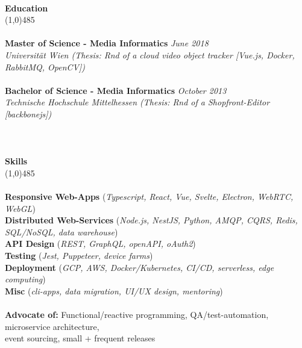 \documentclass[9pt]{extarticle}
\newcommand\tab[1][1cm]{\hspace*{#1}}
\newcommand\smallspace[1][0.23cm]{\hspace*{#1}}
\newcommand\negativespace[1][-0.12cm]{\hspace*{#1}}
\begin{document}
\noindent %
\\
\vspace*{-6pt}
{\negativespace \Large \bf Education}\\
\line(1,0){485}\\
\\
\noindent
{\bf Master of Science - Media Informatics} \hfill \textit{June 2018} \\ 
\textit{Universität Wien (Thesis: Rnd of a cloud video object tracker [Vue.js, Docker, RabbitMQ, OpenCV])}\\\\
\noindent
{\bf Bachelor of Science - Media Informatics} \hfill \textit{October 2013} \\
\textit{Technische Hochschule Mittelhessen (Thesis: Rnd of a Shopfront-Editor [backbonejs])}\\
\\
\\\\
\vspace*{-6pt}
{\negativespace \Large \bf Skills}\\
\line(1,0){485}\\
\\
\noindent
{\bf Responsive Web-Apps } (\textit{Typescript, React, Vue, Svelte, Electron, WebRTC, WebGL}) \\
{\bf Distributed Web-Services } (\textit{Node.js, NestJS, Python, AMQP, CQRS, Redis, SQL/NoSQL, data warehouse}) \\
{\bf API Design }(\textit{REST, GraphQL, openAPI, oAuth2}) \\
{\bf Testing }(\textit{Jest, Puppeteer, device farms}) \\
{\bf Deployment }(\textit{GCP, AWS, Docker/Kubernetes, CI/CD, serverless, edge computing}) \\
{\bf Misc }(\textit{cli-apps, data migration, UI/UX design, mentoring}) \\\\
\noindent
{\bf Advocate of:} Functional/reactive programming, QA/test-automation, microservice architecture,\\ 
 \tab \tab \smallspace event sourcing, small + frequent releases
\end{document}
